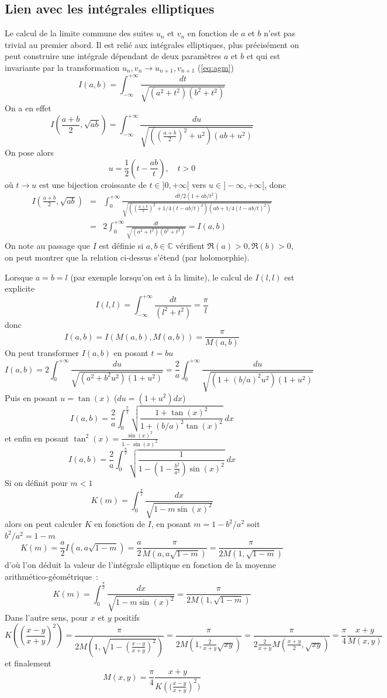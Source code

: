 \documentclass[a4paper,11pt]{article}
\newcommand{\C}{{\mathbb{C}}}
\begin{document}
\begin{giacjshere}
\subsection{Lien avec les int\'egrales elliptiques}
Le calcul de la limite commune des suites $u_n$ et $v_n$ en fonction
de $a$ et $b$ n'est pas trivial
au premier abord. Il est reli\'e aux int\'egrales elliptiques, plus
pr\'ecis\'ement on peut construire une int\'egrale d\'ependant
de deux param\`etres $a$ et $b$ et qui est invariante par
la transformation $u_n,v_n \rightarrow u_{n+1},v_{n+1}$ (\ref{eq:agm})
\[ I(a,b)=\int_{-\infty}^{+\infty}  \frac{dt} {\sqrt{(a^2+t^2)(b^2+t^2)}}
\]
On a en effet
\[ I(\frac{a+b}{2},\sqrt{ab})
= \int_{-\infty}^{+\infty}  \frac{du}{\sqrt{((\frac{a+b}{2})^2+u^2)(ab+u^2)}} \]
On pose alors 
\[ u=\frac{1}{2} (t-\frac{ab}{t}), \quad t>0 \]
o\`u $t \rightarrow u$ est une bijection croissante de $t\in]0,+\infty[$ vers 
$u \in ]-\infty,+\infty[$, donc
\begin{eqnarray*}
I(\frac{a+b}{2},\sqrt{ab})
&=& \int_{0}^{+\infty}  \frac{dt/2(1+ab/t^2)}{\sqrt{((\frac{a+b}{2})^2+1/4(t-ab/t)^2)(ab+1/4(t-ab/t)^2)}}\\
&=& 2 \int_{0}^{+\infty} \frac{dt}{\sqrt{(a^2+t^2)(b^2+t^2)}}
= I(a,b)
\end{eqnarray*}
On note au passage que $I$ est définie si $a,b \in \C$ vérifient $\Re(a)>0, \Re(b)>0$,
on peut montrer que la relation ci-dessus s'étend (par holomorphie).

Lorsque $a=b=l$ (par exemple lorsqu'on est \`a la limite), 
le calcul de $I(l,l)$ est explicite
\[ I(l,l)=\int_{-\infty}^{+\infty}  \frac{dt}{(l^2+t^2)} = \frac{\pi}{l}\]
donc
\[ I(a,b)=I(M(a,b),M(a,b))=\frac{\pi}{M(a,b)}\]
On peut transformer $I(a,b)$ en posant $t=bu$
\[ I(a,b)=2\int_{0}^{+\infty}  \frac{du}{\sqrt{(a^2+b^2u^2)(1+u^2)}}
= \frac{2}{a} \int_{0}^{+\infty}  \frac{du}{\sqrt{(1+(b/a)^2u^2)(1+u^2)}} \]
Puis en posant $u=\tan(x)$ ($du=(1+u^2) dx$)
\[ I(a,b)=\frac{2}{a} \int_0^{\frac{\pi}{2}} 
\sqrt{\frac{1+\tan(x)^2}{1+(b/a)^2\tan(x)^2}} \ dx \]
et enfin en posant $\tan^2(x)=\frac{\sin(x)^2}{1-\sin(x)^2}$
\[ I(a,b)= \frac{2}{a} \int_0^{\frac{\pi}{2}}  
\sqrt{ \frac{1}{1-(1-\frac{b^2}{a^2})\sin(x)^2} } \ dx\]
Si on d\'efinit pour $m<1$
\[ K(m)=\int_0^{\frac{\pi}{2}} \frac{dx}{\sqrt{1-m \sin(x)^2}} \]
alors on peut calculer $K$ en fonction de $I$, en posant
$m=1-b^2/a^2$ soit $b^2/a^2=1-m$
\[ K(m)=\frac{a}{2} I(a,a\sqrt{1-m})=\frac{a}{2}\frac{\pi}{M(a,a\sqrt{1-m})}
=\frac{\pi}{2M(1,\sqrt{1-m})} 
\]
d'o\`u l'on d\'eduit la valeur de l'int\'egrale elliptique en fonction
de la moyenne arithm\'etico-g\'eom\'etrique~:
\begin{equation} \label{eq:K}
K(m)=\int_0^{\frac{\pi}{2}} \frac{dx}{\sqrt{1-m \sin(x)^2}}= 
\frac{\pi}{2M(1,\sqrt{1-m})} 
\end{equation}
Dans l'autre sens, pour $x$ et $y$ positifs
\[ K( (\frac{x-y}{x+y})^2 )=  \frac{\pi}{2M(1,\sqrt{1-(\frac{x-y}{x+y})^2})}
=  \frac{\pi}{2M(1,\frac{2}{x+y}\sqrt{xy})}
= \frac{\pi}{2 \frac{2}{x+y} M(\frac{x+y}{2},\sqrt{xy}) }
= \frac{\pi}{4} \frac{x+y}{M(x,y)}
\]
et finalement
\[ M(x,y)=\frac{\pi}{4} \frac{x+y}{ K\left( (\frac{x-y}{x+y}\right)^2 )}\]


\end{giacjshere}
\end{document}
